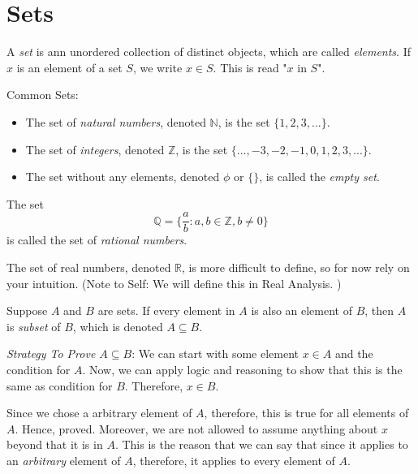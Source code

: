 \chapter{Sets}

\begin{definition} 
	A \emph{set} is ann unordered collection of distinct objects, which are called \emph{elements}.
	If $x$ is an element of a set $S$, we write $x \in S$. This is read "$x$ in $S$".
\end{definition}

\begin{definition}
	Common Sets:

	\begin{itemize}
		\item The set of \emph{natural numbers}, denoted $\mathbb{N}$, is the set $\{1, 2, 3, ...\}$.
		\item The set of \emph{integers}, denoted $\mathbb{Z}$, is the set $\{..., -3, -2, -1, 0, 1, 2, 3, ...\}$.
		\item The set without any elements, denoted $\phi$ or $\{\}$, is called the \emph{empty set}.
	\end{itemize}
\end{definition}

\begin{definition}
	The set $$\mathbb{Q} = \{ \frac{a}{b} : a, b \in \mathbb{Z}, b \neq 0 \}$$ is called the set of \emph{rational numbers}.
\end{definition}


The set of real numbers, denoted $\mathbb{R}$, is more difficult to define, so for now rely on your intuition. (Note to Self: We will define this in Real Analysis. )

\begin{definition}
	Suppose $A$ and $B$ are sets. If every element in $A$ is also an element of $B$, then $A$ is \emph{subset} of $B$, which is denoted $A \subseteq B$.
\end{definition}


\emph{Strategy To Prove $A \subseteq B$}: We can start with some element $x \in A$ and the condition for $A$. Now, we can apply logic and reasoning to show that this is the same as condition for $B$. Therefore, $x \in B$. 

Since we chose a arbitrary element of $A$, therefore, this is true for all elements of $A$. Hence, proved.
Moreover, we are not allowed to assume anything about $x$ beyond that it is in $A$. This is the reason that we can say that since it applies to an \emph{arbitrary} element of $A$, therefore, it applies to every element of $A$.


